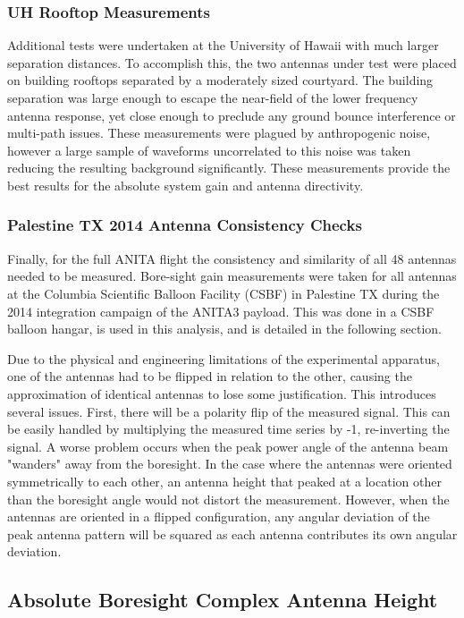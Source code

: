 	
		\subsubsection{UH Rooftop Measurements}
	Additional tests were undertaken at the University of Hawaii with much larger separation distances.  To accomplish this, the two antennas under test were placed on building rooftops separated by a moderately sized courtyard.  The building separation was large enough to escape the near-field of the lower frequency antenna response, yet close enough to preclude any ground bounce interference or multi-path issues.  These measurements were plagued by anthropogenic noise, however a large sample of waveforms uncorrelated to this noise was taken reducing the resulting background significantly.  These measurements provide the best results for the absolute system gain and antenna directivity.
	
		\subsubsection{Palestine TX 2014 Antenna Consistency Checks}
	Finally, for the full ANITA flight the consistency and similarity of all 48 antennas needed to be measured.  Bore-sight gain measurements were taken for all antennas at the Columbia Scientific Balloon Facility (CSBF) in Palestine TX during the 2014 integration campaign of the ANITA3 payload.  This was done in a CSBF balloon hangar, is used in this analysis, and is detailed in the following section.
	
	Due to the physical and engineering limitations of the experimental apparatus, one of the antennas had to be flipped in relation to the other, causing the approximation of identical antennas to lose some justification.  This introduces several issues.  First, there will be a polarity flip of the measured signal.  This can be easily handled by multiplying the measured time series by -1, re-inverting the signal.  A worse problem occurs when the peak power angle of the antenna beam "wanders" away from the boresight.  In the case where the antennas were oriented symmetrically to each other, an antenna height that peaked at a location other than the boresight angle would not distort the measurement.  However, when the antennas are oriented in a flipped configuration, any angular deviation of the peak antenna pattern will be squared as each antenna contributes its own angular deviation.  
	
	
	
	\subsection{Absolute Boresight Complex Antenna Height}
		
